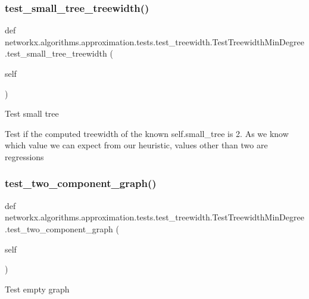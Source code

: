 \subsubsection{\texorpdfstring{test\+\_\+small\+\_\+tree\+\_\+treewidth()}{test\_small\_tree\_treewidth()}}
{\footnotesize\ttfamily def networkx.\+algorithms.\+approximation.\+tests.\+test\+\_\+treewidth.\+Test\+Treewidth\+Min\+Degree.\+test\+\_\+small\+\_\+tree\+\_\+treewidth (\begin{DoxyParamCaption}\item[{}]{self }\end{DoxyParamCaption})}

\begin{DoxyVerb}Test small tree

Test if the computed treewidth of the known self.small_tree is 2.
As we know which value we can expect from our heuristic, values other
than two are regressions
\end{DoxyVerb}
 \mbox{\label{classnetworkx_1_1algorithms_1_1approximation_1_1tests_1_1test__treewidth_1_1TestTreewidthMinDegree_ae4037bfe1739abda03cf0d0f2bcc1474}} 
\subsubsection{\texorpdfstring{test\+\_\+two\+\_\+component\+\_\+graph()}{test\_two\_component\_graph()}}
{\footnotesize\ttfamily def networkx.\+algorithms.\+approximation.\+tests.\+test\+\_\+treewidth.\+Test\+Treewidth\+Min\+Degree.\+test\+\_\+two\+\_\+component\+\_\+graph (\begin{DoxyParamCaption}\item[{}]{self }\end{DoxyParamCaption})}

\begin{DoxyVerb}Test empty graph\end{DoxyVerb}
 

